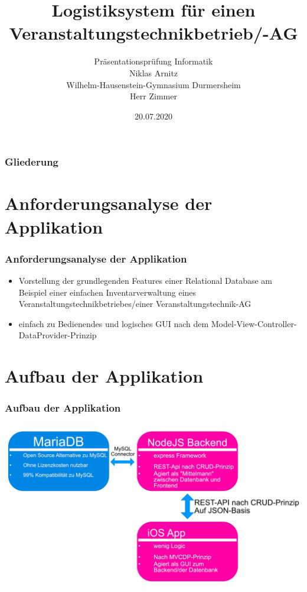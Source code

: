 \documentclass[aspectratio=169]{beamer}
\title{Logistiksystem für einen Veranstaltungstechnikbetrieb/-AG}
\author{Präsentationsprüfung Informatik\\Niklas Arnitz\\Wilhelm-Hausenstein-Gymnasium Durmersheim\\Herr Zimmer}
\date{20.07.2020}
\begin{document}
\begin{frame}
	\maketitle
\end{frame}

\begin{frame}
	\frametitle{Gliederung}
	\tableofcontents	
\end{frame}

\section{Anforderungsanalyse der Applikation}
\begin{frame}
	\frametitle{Anforderungsanalyse der Applikation}
	\begin{itemize}
		\item Vorstellung der grundlegenden Features einer Relational Database am Beispiel einer einfachen Inventarverwaltung eines Veranstaltungstechnikbetriebes/einer Veranstaltungstechnik-AG
		\item einfach zu Bedienendes und logisches GUI nach dem Model-View-Controller-DataProvider-Prinzip
	\end{itemize}
\end{frame}

\section{Aufbau der Applikation}
\begin{frame}
	\frametitle{Aufbau der Applikation}
	\includegraphics[width=\textwidth]{presentation/image01}
\end{frame}
\end{document}
